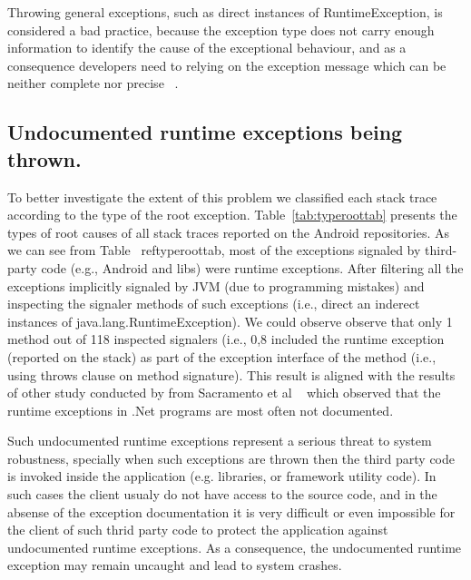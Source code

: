 \documentclass[conference]{IEEEtran}
\begin{document}
Throwing general exceptions, such as direct instances of RuntimeException, is  considered a
bad practice, because the exception type does not carry enough information to identify the
cause of the exceptional behaviour, and as a consequence developers need to relying on
the exception message which can be neither complete nor precise
~\cite{gosling2000java}.


\subsection{Undocumented runtime exceptions being thrown.}

To better investigate the extent of this problem we classified each stack trace according to the type of the
root exception. Table~\ref{tab:typeroottab} presents the types of root causes of all stack traces reported on 
the Android repositories. As we can see from Table ~ref{typeroottab},  most of the exceptions signaled by third-party code
 (e.g., Android and libs) were runtime exceptions. After filtering all the exceptions implicitly signaled by 
JVM (due to programming mistakes) and inspecting the signaler methods of such exceptions (i.e.,  direct an inderect 
instances of java.lang.RuntimeException). We could observe observe that only 1 method out of 118 inspected signalers
 (i.e., 0,8%
included the runtime exception  (reported on the stack) as part of the exception interface of the method (i.e., using 
throws clause on method signature). This result is aligned with the results of other  study conducted by from 
Sacramento et al ~\cite{sacramento2006unchecked} which observed that the
runtime exceptions in .Net programs are most often not documented.

Such undocumented runtime exceptions represent a serious threat to system robustness, specially
when such exceptions are thrown then the third party code is invoked inside the application (e.g. libraries, or framework utility code).
In such cases the client usualy do not have access to the source code, and in the absense of
the exception documentation it is very difficult or even impossible for the client of such thrid party code to 
protect the application against undocumented runtime exceptions. As a consequence, the
 undocumented runtime exception may remain uncaught and lead to system crashes.
\end{document}
